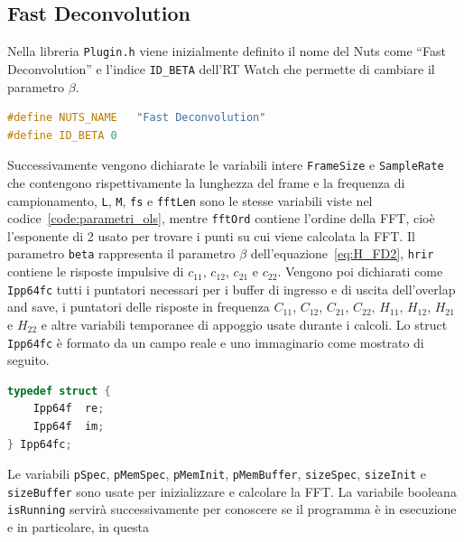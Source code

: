 \documentclass[12pt,a4paper,titlepage]{article}
\begin{document}
\subsection{Fast Deconvolution}
\label{sec:codice_c_fd}
Nella libreria \texttt{Plugin.h} viene inizialmente definito il nome del Nuts come ``Fast Deconvolution'' e l'indice \texttt{ID\_BETA} dell'RT Watch che permette di cambiare il parametro $\beta$.

\begin{lstlisting}[language=cpp, label=code:costanti_c, caption = Dichiarazione delle costanti in \texttt{Plugin.h},captionpos = b]
#define NUTS_NAME	"Fast Deconvolution"
#define ID_BETA 0
\end{lstlisting}

Successivamente vengono dichiarate le variabili intere \texttt{FrameSize} e \texttt{SampleRate} che contengono rispettivamente la lunghezza del frame e la frequenza di campionamento, \texttt{L}, \texttt{M}, \texttt{fs} e \texttt{fftLen} sono le stesse variabili viste nel codice~\ref{code:parametri_ols}, mentre \texttt{fftOrd} contiene l'ordine della FFT, cioè l'esponente di 2 usato per trovare i punti su cui viene calcolata la FFT. Il parametro \texttt{beta} rappresenta il parametro $\beta$ dell'equazione~\eqref{eq:H_FD2}, \texttt{hrir} contiene le risposte impulsive di $c_{11}$, $c_{12}$, $c_{21}$ e $c_{22}$. Vengono poi dichiarati come \texttt{Ipp64fc} tutti i puntatori necessari per i buffer di ingresso e di uscita dell'overlap and save, i puntatori delle risposte in frequenza  $C_{11}$, $C_{12}$, $C_{21}$, $C_{22}$, $H_{11}$, $H_{12}$, $H_{21}$ e $H_{22}$ e altre variabili temporanee di appoggio usate durante i calcoli. Lo struct \texttt{Ipp64fc} è formato da un campo reale e uno immaginario come mostrato di seguito.

\begin{lstlisting}[language=cpp, label=code:Ipp64fc, caption = Struct \texttt{Ipp64fc}, captionpos = b]
typedef struct {
    Ipp64f  re;
    Ipp64f  im;
} Ipp64fc;
\end{lstlisting}

Le variabili \texttt{pSpec}, \texttt{pMemSpec}, \texttt{pMemInit}, \texttt{pMemBuffer}, \texttt{sizeSpec}, \texttt{sizeInit} e \texttt{sizeBuffer} sono usate per inizializzare e calcolare la FFT. La variabile booleana \texttt{isRunning} servirà successivamente per conoscere se il programma è in esecuzione e in particolare, in questa 
\end{document}
